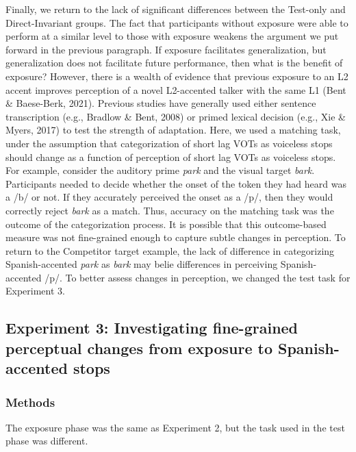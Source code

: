 \documentclass[
  12pt,
  twoside]{article}
\begin{document}
Finally, we return to the lack of significant differences between the Test-only and Direct-Invariant groups.
The fact that participants without exposure were able to perform at a similar level to those with exposure weakens the argument we put forward in the previous paragraph.
If exposure facilitates generalization, but generalization does not facilitate future performance, then what is the benefit of exposure?
However, there is a wealth of evidence that previous exposure to an L2 accent improves perception of a novel L2-accented talker with the same L1 (Bent \& Baese-Berk, 2021).
Previous studies have generally used either sentence transcription (e.g., Bradlow \& Bent, 2008) or primed lexical decision (e.g., Xie \& Myers, 2017) to test the strength of adaptation.
Here, we used a matching task, under the assumption that categorization of short lag VOTs as voiceless stops should change as a function of perception of short lag VOTs as voiceless stops.
For example, consider the auditory prime \emph{park} and the visual target \emph{bark}.
Participants needed to decide whether the onset of the token they had heard was a /b/ or not.
If they accurately perceived the onset as a /p/, then they would correctly reject \emph{bark} as a match.
Thus, accuracy on the matching task was the outcome of the categorization process.
It is possible that this outcome-based measure was not fine-grained enough to capture subtle changes in perception.
To return to the Competitor target example, the lack of difference in categorizing Spanish-accented \emph{park} as \emph{bark} may belie differences in perceiving Spanish-accented /p/.
To better assess changes in perception, we changed the test task for Experiment 3.

\hypertarget{experiment-3-investigating-fine-grained-perceptual-changes-from-exposure-to-spanish-accented-stops}{%
\subsection{Experiment 3: Investigating fine-grained perceptual changes from exposure to Spanish-accented stops}\label{experiment-3-investigating-fine-grained-perceptual-changes-from-exposure-to-spanish-accented-stops}}

\hypertarget{methods-2}{%
\subsubsection{Methods}\label{methods-2}}

The exposure phase was the same as Experiment 2, but the task used in the test phase was different.
\end{document}
